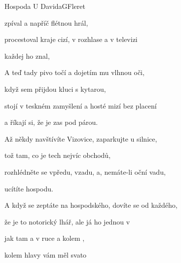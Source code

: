 \begin{song}{Hospoda U Davida}{G}{Fleret}
\begin{SBChorus}
zpíval a napříč flétnou hrál,

procestoval kraje cizí, v rozhlase a v televizi

každej ho znal,

A teď tady pivo točí a dojetím mu vlhnou oči,

když sem přijdou kluci s kytarou,

stojí v teskném zamyšlení a hosté mizí bez placení

a říkají si, že je zas pod párou.
\end{SBChorus}
\begin{SBVerse}
Až někdy navštívíte Vizovice, zaparkujte u silnice,

tož tam, co je tech nejvíc obchodů,

rozhlédněte se vpředu, vzadu, a, nemáte-li oční vadu,

ucítíte hospodu.

A když se zeptáte na hospodského, dovíte se od každého,

že je to notorický lhář, ale já ho  jednou v 

jak tam  a v ruce  a kolem , 

kolem hlavy vám měl svato
\end{SBVerse}
\end{song}

\pagebreak
